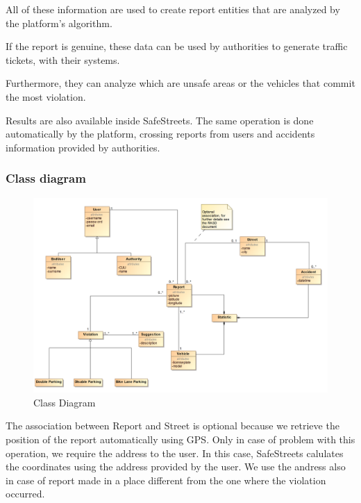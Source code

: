 All of these information are used to create report entities that are analyzed by the platform’s algorithm.

If the report is genuine, these data can be used by authorities to generate traffic tickets, with their systems.

Furthermore, they can analyze which are unsafe areas or the vehicles that commit the most violation.

Results are also available inside SafeStreets.
The same operation is done automatically by the platform, crossing reports from users and accidents information provided by authorities.


\subsubsection{Class diagram}
\begin{figure}[H]
	\centering
	\includegraphics[width=1.12\linewidth]{Images/ClassDiagram.png}
	\caption{Class Diagram}
\end{figure}
The association between Report and Street is optional because we retrieve the position of the report automatically using GPS. Only in case of problem with this operation, we require the address to the user. In this case, SafeStreets calulates the coordinates using the address provided by the user. We use the andress also in case of report made in a place different from the one where the violation occurred. 
